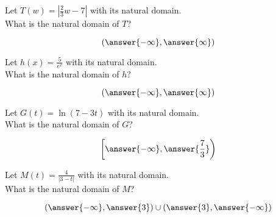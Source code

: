 \documentclass{ximera}
\author{Lee Wayand}
\begin{document}
\begin{exercise}








\begin{question}


Let $T(w) = | \tfrac{2}{3} w - 7 |$ with its natural domain. \\

What is the natural domain of $T$?

\[
\left( \answer{-\infty},  \answer{\infty}  \right)
\]


\end{question}







\begin{question}


Let $h(x) = \frac{5}{e^x}$ with its natural domain. \\

What is the natural domain of $h$?

\[
\left( \answer{-\infty},  \answer{\infty}  \right)
\]


\end{question}








\begin{question}


Let $G(t) = \ln(7 - 3t)$ with its natural domain. \\

What is the natural domain of $G$?

\[
\left[  \answer{-\infty}, \answer{\frac{7}{3}}  \right)
\]


\end{question}








\begin{question}


Let $M(t) = \frac{4}{| 3 - t |}$ with its natural domain. \\

What is the natural domain of $M$?

\[
\left( \answer{-\infty}, \answer{3} \right) \cup  \left( \answer{3} , \answer{-\infty} \right) 
\]


\end{question}













\end{exercise}
\end{document}
